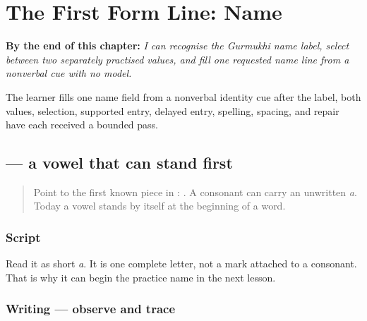 
\chapter{The First Form Line: Name}
\label{ch:pa-form-name}

\begin{chapteropening}
\textbf{By the end of this chapter:} \emph{I can recognise the Gurmukhi name label, select between two separately practised values, and fill one requested name line from a nonverbal cue with no model.}

The learner fills one name field from a nonverbal identity cue after the label, both values, selection, supported entry, delayed entry, spelling, spacing, and repair have each received a bounded pass.
\end{chapteropening}

\section[\texorpdfstring{\pa{ਅ} (a)}{ਅ (a)}]{ — a vowel that can stand first}

\label{lesson:PA-W02-a}



\begin{quote}
Point to the first known piece in \textbf{}: \textbf{}. A consonant can carry an unwritten \emph{a}. Today a vowel stands by itself at the beginning of a word.
\end{quote}

\subsection*{Script}
\begin{quote}
\textbf{}
\end{quote}

Read it as short \emph{a}. It is one complete letter, not a mark attached to a consonant. That is why it can begin the practice name in the next lesson.

\subsection*{Writing — observe and trace}

